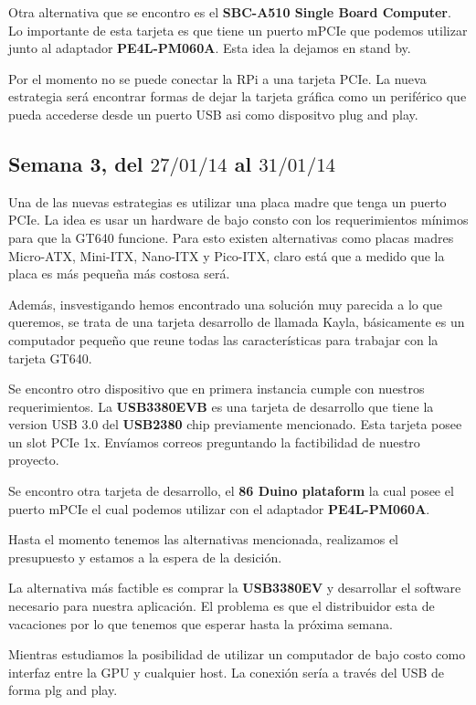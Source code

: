 \documentclass[11pt,oneside,titlepage]{article}
\begin{document}
Otra alternativa que se encontro es el \textbf{SBC-A510 Single Board Computer}. Lo
importante de esta tarjeta es que tiene un puerto mPCIe que podemos utilizar junto
al adaptador \textbf{PE4L-PM060A}. Esta idea la dejamos en stand by.

Por el momento no se puede conectar la RPi a una tarjeta PCIe. La nueva estrategia
será encontrar formas de dejar la tarjeta gráfica como un periférico que pueda
accederse desde un puerto USB asi como dispositvo plug and play.

\subsection*{Semana 3, del $27/01/14$ al $31/01/14$}

Una de las nuevas estrategias es utilizar una placa madre que tenga un puerto
PCIe. La idea es usar un hardware de bajo consto con los requerimientos mínimos
para que la GT640 funcione. Para esto existen alternativas como placas madres
Micro-ATX, Mini-ITX, Nano-ITX y Pico-ITX, claro está que a medido que la placa
es más pequeña más costosa será. 

Además, insvestigando hemos encontrado una solución muy parecida a lo que
queremos, se trata de una tarjeta desarrollo de llamada Kayla, básicamente es
un computador pequeño que reune todas las características para trabajar con la
tarjeta GT640.  

Se encontro otro dispositivo que en primera instancia cumple con nuestros
requerimientos. La \textbf{USB3380EVB} es una tarjeta de desarrollo que tiene la
version USB 3.0 del \textbf{USB2380} chip previamente mencionado. Esta tarjeta
posee un slot PCIe 1x. Envíamos correos preguntando la factibilidad de nuestro
proyecto.

Se encontro otra tarjeta de desarrollo, el \textbf{86 Duino plataform} la cual
posee el puerto mPCIe el cual podemos utilizar con el adaptador
\textbf{PE4L-PM060A}.

Hasta el momento tenemos las alternativas mencionada, realizamos el presupuesto y
estamos a la espera de la desición.

La alternativa más factible es comprar la \textbf{USB3380EV} y desarrollar el
software necesario para nuestra aplicación. El problema es que el distribuidor
esta de vacaciones por lo que tenemos que esperar hasta la próxima semana.

Mientras estudiamos la posibilidad de utilizar un computador de bajo costo como
interfaz entre la GPU y cualquier host. La conexión sería a trav\'es del USB de
forma plg and play.
\end{document}
